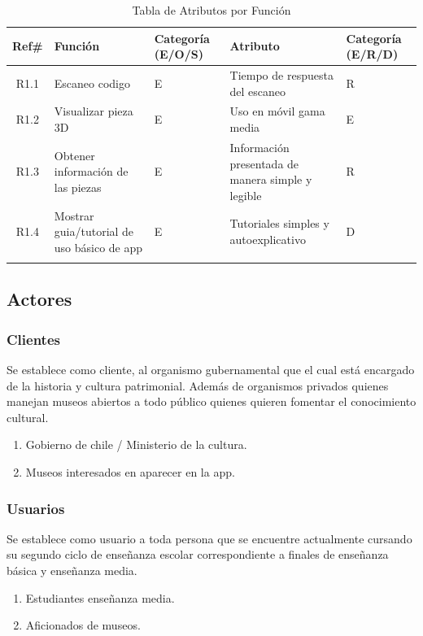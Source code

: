 \begin{longtable}{|c|p{4.7cm}|p{1.8cm}|p{4.7cm}|p{1.8cm}|}
\hline 
Ref\# & Función & Categoría (E/O/S) & Atributo & Categoría (E/R/D)\\ 
\hline 
R1.1 & Escaneo codigo & E & Tiempo de respuesta del escaneo & R \\ 
\hline 
R1.2 & Visualizar pieza 3D & E & Uso en móvil gama media & E \\ 
\hline
R1.3 & Obtener información de las piezas & E & Información presentada de manera simple y legible & R \\ 
\hline
R1.4 & Mostrar guia/tutorial de uso básico de app & E & Tutoriales simples y autoexplicativo & D \\ 
\hline
\caption{Tabla de Atributos por Función}
\label{tab20}\\
\end{longtable}

\newpage
\subsection{Actores}

\subsubsection{Clientes}
Se establece como cliente, al organismo gubernamental que el cual está encargado de la historia y cultura patrimonial. Además de organismos privados quienes manejan museos abiertos a todo público quienes quieren fomentar el conocimiento cultural.

\begin{enumerate}
	\item Gobierno de chile / Ministerio de la cultura.
	\item Museos interesados en aparecer en la app.
\end{enumerate}

\subsubsection{Usuarios}
Se establece como usuario a toda persona que se encuentre actualmente cursando su segundo ciclo de enseñanza escolar correspondiente a finales de enseñanza básica y enseñanza media.

\begin{enumerate}
	\item Estudiantes enseñanza media.
	\item Aficionados de museos.

\end{enumerate}

